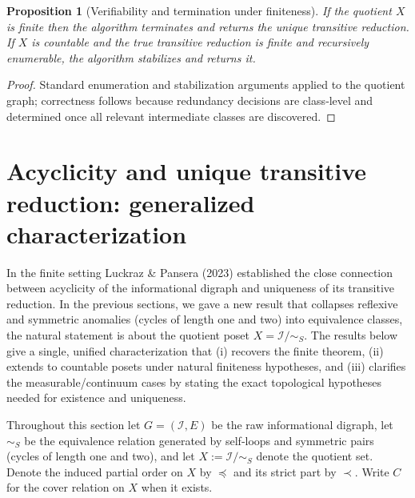 \documentclass[11pt]{article}
\newtheorem{proposition}[definition]{Proposition}
\begin{document}
\begin{proposition}[Verifiability and termination under finiteness]
If the quotient \(X\) is finite then the algorithm terminates and returns
the unique transitive reduction. If \(X\) is countable and the true
transitive reduction is finite and recursively enumerable, the algorithm
stabilizes and returns it.
\end{proposition}

\begin{proof}
Standard enumeration and stabilization arguments applied to the quotient
graph; correctness follows because redundancy decisions are class‑level
and determined once all relevant intermediate classes are discovered.
\end{proof}

\section{Acyclicity and unique transitive reduction: generalized characterization}
\label{sec:acyclicity-uniqueTR}

In the finite setting Luckraz \& Pansera (2023)
established the close connection between acyclicity of the informational
digraph and uniqueness of its transitive reduction. In the previous sections, we gave a new result
that collapses reflexive and symmetric anomalies (cycles of length one
and two) into equivalence classes, the natural statement is about the
quotient poset \(X=\mathcal I/\!\sim_S\). The results below give a
single, unified characterization that (i) recovers the finite theorem,
(ii) extends to countable posets under natural finiteness hypotheses,
and (iii) clarifies the measurable/continuum cases by stating the exact
topological hypotheses needed for existence and uniqueness.

Throughout this section let \(G=(\mathcal I,E)\) be the raw informational
digraph, let \(\sim_S\) be the equivalence relation generated by
self‑loops and symmetric pairs (cycles of length one and two), and let
\(X:=\mathcal I/\!\sim_S\) denote the quotient set. Denote the induced
partial order on \(X\) by \(\preceq\) and its strict part by \(\prec\).
Write \(C\) for the cover relation on \(X\) when it exists.
\end{document}

